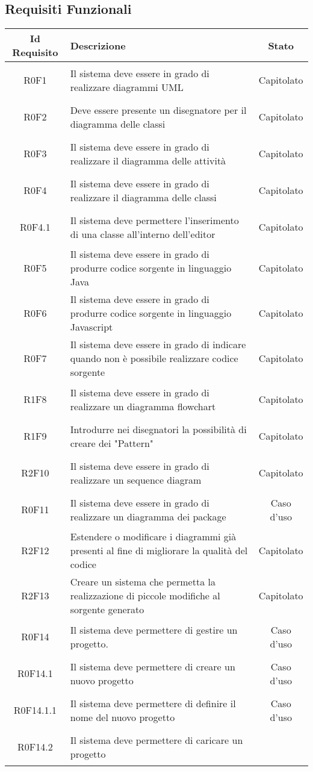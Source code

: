 \documentclass[../AnalisiDeiRequisiti.tex]{subfiles}
\begin{document}
\newpage
\subsection{Requisiti Funzionali}
\normalsize
\begin{longtable}{|c|>{\centering}p{7cm}|c|}
	\hline
	\textbf{Id Requisito} & \textbf{Descrizione} & \textbf{Stato}\\
	\hline
	\endhead
	\hypertarget{R0F1}{R0F1} & Il sistema deve essere in grado di realizzare diagrammi UML & Capitolato \\ \hline
	\hypertarget{R0F2}{R0F2} & Deve essere presente un disegnatore per il diagramma delle classi & Capitolato \\ \hline
	\hypertarget{R0F3}{R0F3} & Il sistema deve essere in grado di realizzare il diagramma delle attività & Capitolato \\ \hline
	\hypertarget{R0F4}{R0F4} & Il sistema deve essere in grado di realizzare il diagramma delle classi & Capitolato \\ \hline
	\hypertarget{R0F4.1}{R0F4.1} & Il sistema deve permettere l'inserimento di una classe all'interno dell'editor & Capitolato \\ \hline
	\hypertarget{R0F5}{R0F5} & Il sistema deve essere in grado di produrre codice sorgente in linguaggio Java & Capitolato \\ \hline
	\hypertarget{R0F6}{R0F6} & Il sistema deve essere in grado di produrre codice sorgente in linguaggio Javascript & Capitolato \\ \hline
	\hypertarget{R0F7}{R0F7} & Il sistema deve essere in grado di indicare quando non è possibile realizzare codice sorgente & Capitolato \\ \hline
	\hypertarget{R1F8}{R1F8} & Il sistema deve essere in grado di realizzare un diagramma flowchart & Capitolato \\ \hline
	\hypertarget{R1F9}{R1F9} & Introdurre nei disegnatori la possibilità di creare dei "Pattern" & Capitolato \\ \hline
	\hypertarget{R2F10}{R2F10} & Il sistema deve essere in grado di realizzare un sequence diagram & Capitolato \\ \hline
	\hypertarget{R0F11}{R0F11} & Il sistema deve essere in grado di realizzare un diagramma dei package & Caso d'uso \\ \hline
	\hypertarget{R2F12}{R2F12} & Estendere o modificare i diagrammi già presenti al fine di migliorare la qualità del codice & Capitolato \\ \hline
	\hypertarget{R2F13}{R2F13} & Creare un sistema che permetta la realizzazione di piccole modifiche al sorgente generato & Capitolato \\ \hline
	\hypertarget{R0F14}{R0F14} & Il sistema deve permettere di gestire un progetto. & Caso d'uso \\ \hline
	\hypertarget{R0F14.1}{R0F14.1} & Il sistema deve permettere di creare un nuovo progetto & Caso d'uso \\ \hline
	\hypertarget{R0F14.1.1}{R0F14.1.1} & Il sistema deve permettere di definire il nome del nuovo progetto & Caso d'uso \\ \hline
	\hypertarget{R0F14.2}{R0F14.2} & Il sistema deve permettere di caricare un progetto


\end{longtable}
\end{document}
